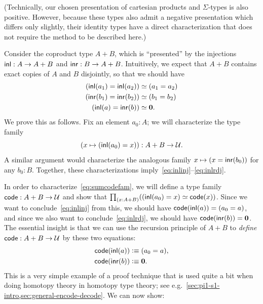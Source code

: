 (Technically, our chosen presentation of cartesian products and $\Sigma$-types is also positive.
However, because these types also admit a negative presentation which differs only slightly, their identity types have a direct characterization that does not require the method to be described here.)

Consider the coproduct type $A+B$, which is ``presented'' by the injections ${\mathsf{inl}}:A\to A+B$ and ${\mathsf{inr}}:B\to A+B$.
Intuitively, we expect that $A+B$ contains exact copies of $A$ and $B$ disjointly, so that we should have
\begin{align}
  {(\inl(a_1)=\inl(a_2))}&\eqvsym {(a_1=a_2)} \label{eq:inlinj}\\
  {(\inr(b_1)=\inr(b_2))}&\eqvsym {(b_1=b_2)}\\
  {(\inl(a)= \inr(b))} &\eqvsym {\emptyt}. \label{eq:inlrdj}
\end{align}
We prove this as follows.
Fix an element $a_0:A$; we will characterize the type family
\begin{equation}
  (x\mapsto ({\mathsf{inl}}(a_0)=x)) : A+B \to \mathcal{U}.\label{eq:sumcodefam}
\end{equation}
A similar argument would characterize the analogous family $x\mapsto (x = {\mathsf{inr}}(b_0))$ for any $b_0:B$.
Together, these characterizations imply~\eqref{eq:inlinj}--\eqref{eq:inlrdj}.

In order to characterize~\eqref{eq:sumcodefam}, we will define a type family $\mathsf{code}:A+B\to\mathcal{U}$ and show that $\prd{x:A+B} (\eqv{(\inl(a_0)=x)}{\code(x)})$.
Since we want to conclude~\eqref{eq:inlinj} from this, we should have $\mathsf{code}({\mathsf{inl}}(a)) = (a_0=a)$, and since we also want to conclude~\eqref{eq:inlrdj}, we should have $\mathsf{code} ({\mathsf{inr}}(b)) = \mathbf{0}$.
The essential insight is that we can use the recursion principle of $A+B$ to \emph{define} $\mathsf{code}:A+B\to\mathcal{U}$ by these two equations:
\begin{align*}
  \mathsf{code}({\mathsf{inl}}(a)) &\vcentcolon\equiv (a_0=a),\\
  \mathsf{code}({\mathsf{inr}}(b)) &\vcentcolon\equiv \mathbf{0}.
\end{align*}
This is a very simple example of a proof technique that is used quite a
bit when doing homotopy theory in homotopy type theory; see
e.g.\ \cref{sec:pi1-s1-intro,sec:general-encode-decode}.
%
We can now show:

